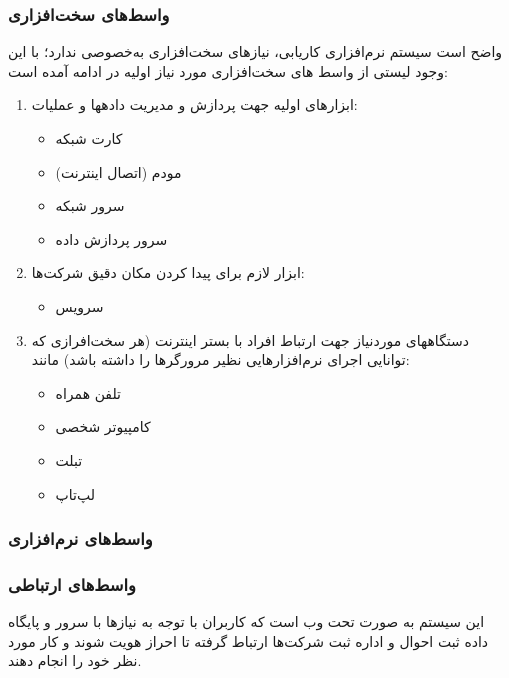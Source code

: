 \documentclass{report}
\begin{document}
				\subsubsection{واسط‌های سخت‌افزاری}
					واضح است سیستم نرم‌افزاری کاریابی، نیازهای سخت‌افزاری به‌خصوصی ندارد؛ با این وجود لیستی از واسط های سخت‌افزاری مورد نیاز اولیه در ادامه آمده است:
					\begin{enumerate}
						\item 
						ابزارهای اولیه جهت پردازش و مدیریت دادهها و عملیات:
							\begin{itemize}
								\item 
								کارت شبکه
								\item 
								مودم (اتصال اینترنت)
								\item 
								سرور شبکه
								\item 
								سرور پردازش داده
							\end{itemize}			
						
						\item 
						ابزار لازم برای پیدا کردن مکان دقیق شرکت‌ها:
						\begin{itemize}
							\item 
							سرویس 
						\end{itemize}
						
						\item 
						دستگاههای موردنیاز جهت ارتباط افراد با بستر اینترنت (هر سخت‌افرازی که توانایی اجرای نرم‌افزارهایی نظیر مرورگرها را داشته باشد) مانند:
						\begin{itemize}
							\item تلفن همراه
							\item کامپیوتر شخصی
							\item تبلت
							\item لپ‌تاپ
						\end{itemize}
						
					\end{enumerate}
				\subsubsection{واسط‌های نرم‌افزاری} 
				\subsubsection{واسط‌های ارتباطی}
					این سیستم به صورت تحت‌ وب است که کاربران با توجه به نیاز‌ها با سرور و پایگاه داده ثبت احوال و اداره ثبت شرکت‌ها ارتباط گرفته تا احراز هویت شوند و کار مورد نظر خود را انجام دهند.
					
\end{document}

